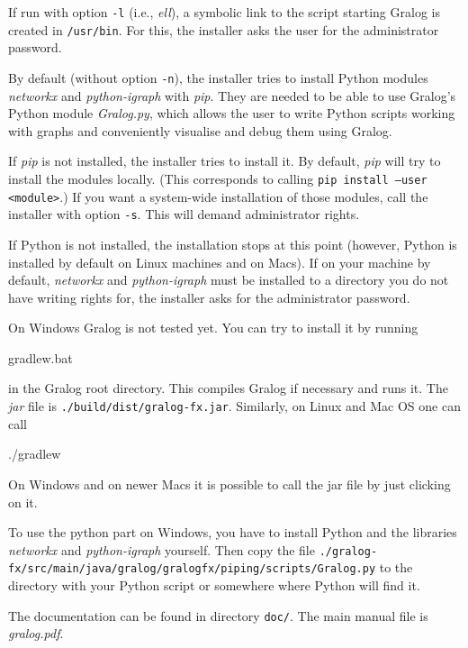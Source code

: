 \documentclass{article}
\begin{document}
If run with option \texttt{-l} (i.e., \emph{ell}), a symbolic link to the script starting Gralog is created in
\texttt{/usr/bin}. For this, the installer asks the user for the administrator
password.

By default (without option \texttt{-n}), the installer tries to
install Python modules \emph{networkx} and \emph{python-igraph} with
\emph{pip}. They are needed to be able to use Gralog's Python module
\emph{Gralog.py}, which allows the user to write Python scripts
working with graphs and conveniently visualise and debug them using
Gralog.

If \emph{pip} is not installed, the installer tries to install it. By
default, \emph{pip} will try to install the modules locally. (This
corresponds to calling \texttt{pip install --user <module>}.) If you
want a system-wide installation of those modules, call the installer
with option \texttt{-s}. This will demand administrator rights.

If
Python is not installed, the installation stops at this point
(however, Python is installed by default on Linux machines and on
Macs). If on your machine by default, \emph{networkx} and
\emph{python-igraph} must be installed to a directory you do not have
writing rights for, the installer asks for the administrator password.


On Windows Gralog is not tested yet. You can try to install it by
running
\\\begin{tcolorbox}
  gradlew.bat
\end{tcolorbox}
in the Gralog root directory. This compiles Gralog if necessary and
runs it. The \emph{jar} file is
\texttt{./build/dist/gralog-fx.jar}. Similarly, on Linux and Mac OS
one can call
\\\begin{tcolorbox}
  ./gradlew
\end{tcolorbox}

On Windows and on newer Macs it is possible to call the jar file by
just clicking on it.

To use the python part on Windows, you have to install Python and the
libraries \emph{networkx} and \emph{python-igraph} yourself. Then copy
the file
\texttt{./gralog-fx/src/main/java/gralog/gralogfx/piping/scripts/Gralog.py}
to the directory with your Python script or somewhere where Python
will find it.


The documentation can be found in directory \texttt{doc/}. The main
manual file is \emph{gralog.pdf}.
\end{document}
